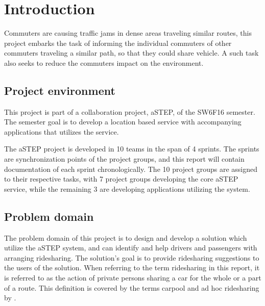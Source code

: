 \chapter{Introduction}\label{ch:introduction}


Commuters are causing traffic jams in dense areas traveling similar routes, this project embarks the task of informing the individual commuters of other commuters traveling a similar path, so that they could share vehicle.
A such task also seeks to reduce the commuters impact on the environment.


\section{Project environment}
This project is part of a collaboration project, aSTEP, of the SW6F16 semester.
The semester goal is to develop a location based service with accompanying applications that utilizes the service. 

The aSTEP project is developed in 10 teams in the span of 4 sprints.
The sprints are synchronization points of the project groups, and this report will contain documentation of each sprint chronologically.
The 10 project groups are assigned to their respective tasks, with 7 project groups developing the core aSTEP service, while the remaining 3 are developing applications utilizing the system.


\section{Problem domain}
The problem domain of this project is to design and develop a solution which utilize the aSTEP system, and can identify and help drivers and passengers with arranging ridesharing.
The solution's goal is to provide ridesharing suggestions to the users of the solution.
When referring to the term ridesharing in this report, it is referred to as the action of private persons sharing a car for the whole or a part of a route. 
This definition is covered by the terms carpool and ad hoc ridesharing by \citet{doi:10.1080/01441647.2011.621557}.  

